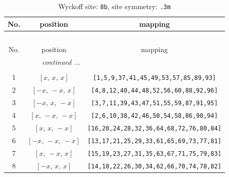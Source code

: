 \documentclass[fleqn,8pt]{jsarticle}
\begin{document}
\begin{longtable}{ccc}
\caption{Wyckoff site: {\tt 8b}, site symmetry: {\tt .3m}}
 \\
 \hline \hline
No. & position & mapping \\ \hline \endfirsthead

\multicolumn{2}{l}{\tablename\ \thetable{}} \\
 \hline \hline
No. & position & mapping \\ \hline \endhead

 \hline \hline
\multicolumn{2}{r}{\footnotesize\it continued ...} \\ \endfoot

 \hline \hline
\multicolumn{2}{r}{} \\ \endlastfoot

1 & $\left[ x,\, x,\, x \right]$ & {\tt [1,5,9,37,41,45,49,53,57,85,89,93]} \\ \hline
2 & $\left[ - x,\, - x,\, x \right]$ & {\tt [4,8,12,40,44,48,52,56,60,88,92,96]} \\ \hline
3 & $\left[ - x,\, x,\, - x \right]$ & {\tt [3,7,11,39,43,47,51,55,59,87,91,95]} \\ \hline
4 & $\left[ x,\, - x,\, - x \right]$ & {\tt [2,6,10,38,42,46,50,54,58,86,90,94]} \\ \hline
5 & $\left[ x,\, x,\, - x \right]$ & {\tt [16,20,24,28,32,36,64,68,72,76,80,84]} \\ \hline
6 & $\left[ - x,\, - x,\, - x \right]$ & {\tt [13,17,21,25,29,33,61,65,69,73,77,81]} \\ \hline
7 & $\left[ x,\, - x,\, x \right]$ & {\tt [15,19,23,27,31,35,63,67,71,75,79,83]} \\ \hline
8 & $\left[ - x,\, x,\, x \right]$ & {\tt [14,18,22,26,30,34,62,66,70,74,78,82]} \\
\end{longtable}
\renewcommand{\arraystretch}{1.2}
\end{document}
